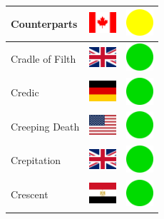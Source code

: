 \documentclass[12pt, a4paper, twoside]{report}
\begin{document}
\begin{center}
\begin{longtable}{|p{5cm}|p{2cm}|p{2cm}|}
 Counterparts                                               & \includegraphics[width=1cm]{4x3/ca} &   \includegraphics[width=1cm]{likes/m} \\ \hline
 Cradle of Filth                                            & \includegraphics[width=1cm]{4x3/gb} &   \includegraphics[width=1cm]{likes/y} \\ \hline
 Credic                                                     & \includegraphics[width=1cm]{4x3/de} &   \includegraphics[width=1cm]{likes/y} \\ \hline
 Creeping Death                                             & \includegraphics[width=1cm]{4x3/us} &   \includegraphics[width=1cm]{likes/y} \\ \hline
 Crepitation                                                & \includegraphics[width=1cm]{4x3/gb} &   \includegraphics[width=1cm]{likes/y} \\ \hline
 Crescent                                                   & \includegraphics[width=1cm]{4x3/eg} &   \includegraphics[width=1cm]{likes/y} \\ \hline

\end{longtable}
\end{center}
\end{document}
